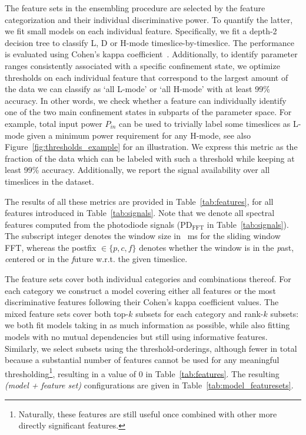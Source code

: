 The feature sets in the ensembling procedure are selected by the feature categorization and their individual discriminative power. To quantify the latter, we fit small models on each individual feature. Specifically, we fit a depth-2 decision tree to classify L, D or H-mode timeslice-by-timeslice. The performance is evaluated using Cohen's kappa coefficient~\cite{cohen1960}. Additionally, to identify parameter ranges consistently associated with a specific confinement state, we optimize thresholds on each individual feature that correspond to the largest amount of the data we can classify as `all L-mode' or `all H-mode' with at least 99\% accuracy. In other words, we check whether a feature can individually identify one of the two main confinement states in subparts of the parameter space. For example, total input power $P_{\textit{in}}$ can be used to trivially label some timeslices as L-mode given a minimum power requirement for any H-mode, see also Figure~\ref{fig:thresholds_example} for an illustration. We express this metric as the fraction of the data which can be labeled with such a threshold while keeping at least 99\% accuracy. Additionally, we report the signal availability over all timeslices in the dataset.

The results of all these metrics are provided in Table~\ref{tab:features}, for all features introduced in Table~\ref{tab:signals}. Note that we denote all spectral features computed from the photodiode signals ($\text{PD}_{\text{FFT}}^{}$ in Table~\ref{tab:signals}). The subscript integer denotes the window size in \SI{}{\milli\second} for the sliding window FFT, whereas the postfix $\in\{\textit{p}, \textit{c}, \textit{f}\}$ denotes whether the window is in the \textit{p}ast, \textit{c}entered or in the \textit{f}uture w.r.t. the given timeslice.

The feature sets cover both individual categories and combinations thereof. For each category we construct a model covering either all features or the most discriminative features following their Cohen's kappa coefficient values. The mixed feature sets cover both top-$k$ subsets for each category and rank-$k$ subsets: we both fit models taking in as much information as possible, while also fitting models with no mutual dependencies but still using informative features. Similarly, we select subsets using the threshold-orderings, although fewer in total because a substantial number of features cannot be used for any meaningful thresholding\footnote{Naturally, these features are still useful once combined with other more directly significant features.}, resulting in a value of 0 in Table~\ref{tab:features}. The resulting \textit{(model + feature set)} configurations are given in Table~\ref{tab:model_featuresets}.

